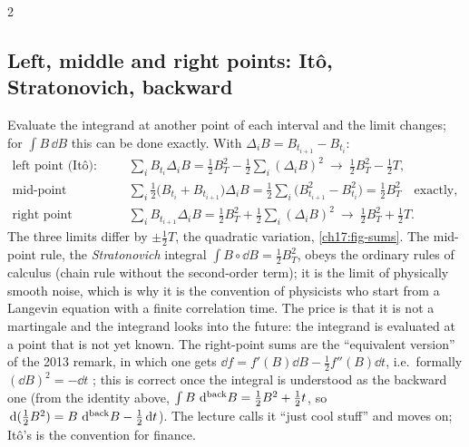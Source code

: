 \begin{paracol}{2}
\subsection{Left, middle and right points: It\^o, Stratonovich, backward}\label{ch17:sec-strat}
Evaluate the integrand at another point of each interval and the limit changes; for $\int B\,\dd B$ this can be done exactly.
With $\Delta_iB=B_{t_{i+1}}-B_{t_i}$:
\begin{align*}
  \text{left point (It\^o):}\quad&\sum_iB_{t_i}\Delta_iB=\tfrac12B_T^2-\tfrac12\sum_i(\Delta_iB)^2\ \to\ \tfrac12B_T^2-\tfrac12T,\\
  \text{mid-point (Stratonovich):}\quad&\sum_i\tfrac12\bigl(B_{t_i}+B_{t_{i+1}}\bigr)\Delta_iB=\tfrac12\sum_i\bigl(B_{t_{i+1}}^2-B_{t_i}^2\bigr)=\tfrac12B_T^2\quad\text{exactly},\\
  \text{right point (backward):}\quad&\sum_iB_{t_{i+1}}\Delta_iB=\tfrac12B_T^2+\tfrac12\sum_i(\Delta_iB)^2\ \to\ \tfrac12B_T^2+\tfrac12T.
\end{align*}
The three limits differ by $\pm\tfrac12T$, the quadratic variation, \cref{ch17:fig-sums}. The mid-point rule, the \emph{Stratonovich} integral $\int B\circ\dd B=\tfrac12B_T^2$,
obeys the ordinary rules of calculus (chain rule without the second-order term); it is the limit of physically smooth noise, which is why it is the
convention of physicists who start from a Langevin equation with a finite correlation time. The price is that it is not
a martingale and the integrand looks into the future: the integrand is evaluated at a point that is not yet known. The right-point sums are
the ``equivalent version'' of the 2013 remark, in which
one gets $\dd f=f'(B)\dd B-\tfrac12f''(B)\dd t$, i.e.\ formally $(\dd B)^2=-\dd t$ ; this is
correct once the integral is understood as the backward one (from the identity above, $\int B\,\,\mathrm{d}^{\rm back}B=\tfrac12B^2+\tfrac12t$, so $\,\mathrm{d}(\tfrac12B^2)=B\,\,\mathrm{d}^{\rm back}B-\tfrac12\,\mathrm{d} t$).
The lecture calls it ``just cool stuff'' and moves on; It\^o's is the convention for finance.


\end{paracol}
